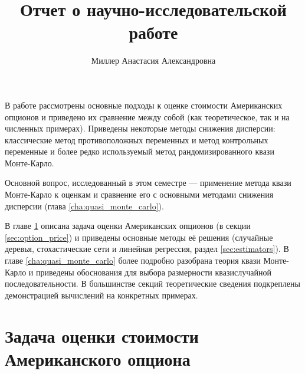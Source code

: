 \documentclass[specialist,
               substylefile = ../spbu.rtx,
               subf,href,colorlinks=true, 10pt]{disser}
\begin{document}
%
%


\title{Отчет о научно-исследовательской работе}


\author{Миллер Анастасия Александровна}


\date{\number\year}

\begin{large}
\maketitle
\end{large}

\intro
В работе рассмотрены основные подходы к оценке стоимости Американских опционов и приведено их сравнение между собой (как теоретическое, так и на численных примерах). Приведены некоторые методы снижения дисперсии: классические метод противоположных переменных и метод контрольных переменные и более редко используемый метод рандомизированного квази Монте-Карло.

Основной вопрос, исследованный в этом семестре --- применение метода квази Монте-Карло к оценкам и сравнение его с основными методами снижения дисперсии (глава \ref{cha:quasi_monte_carlo}).

В главе \ref{cha:option_price_estimation_problem} описана задача оценки Американских опционов (в секции \ref{sec:option_price}) и приведены основные методы её решения (случайные деревья, стохастические сети и линейная регрессия, раздел \ref{sec:estimators}). 
В главе \ref{cha:quasi_monte_carlo} более подробно разобрана теория квази Монте-Карло и приведены обоснования для выбора размерности квазислучайной последовательности. В большинстве секций теоретические сведения подкреплены демонстрацией вычислений на конкретных примерах.

\chapter{Задача оценки стоимости Американского опциона} %
\label{cha:option_price_estimation_problem}
\end{document}
